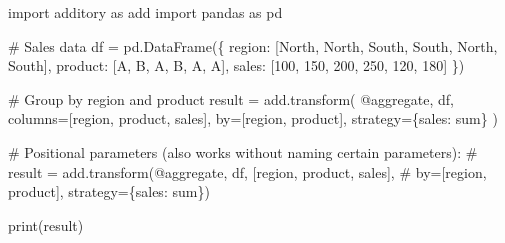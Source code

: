 \documentclass[
  letterpaper,
]{scrbook}
\newenvironment{Shaded}{\begin{snugshade}}{\end{snugshade}}
\newcommand{\BuiltInTok}[1]{\textcolor[rgb]{0.00,0.23,0.31}{#1}}
\newcommand{\CommentTok}[1]{\textcolor[rgb]{0.37,0.37,0.37}{#1}}
\newcommand{\DecValTok}[1]{\textcolor[rgb]{0.68,0.00,0.00}{#1}}
\newcommand{\ImportTok}[1]{\textcolor[rgb]{0.00,0.46,0.62}{#1}}
\newcommand{\NormalTok}[1]{\textcolor[rgb]{0.00,0.23,0.31}{#1}}
\newcommand{\OperatorTok}[1]{\textcolor[rgb]{0.37,0.37,0.37}{#1}}
\newcommand{\StringTok}[1]{\textcolor[rgb]{0.13,0.47,0.30}{#1}}
\begin{document}
\begin{Shaded}
\begin{Highlighting}[]
\ImportTok{import}\NormalTok{ additory }\ImportTok{as}\NormalTok{ add}
\ImportTok{import}\NormalTok{ pandas }\ImportTok{as}\NormalTok{ pd}

\CommentTok{\# Sales data}
\NormalTok{df }\OperatorTok{=}\NormalTok{ pd.DataFrame(\{}
    \StringTok{\textquotesingle{}region\textquotesingle{}}\NormalTok{: [}\StringTok{\textquotesingle{}North\textquotesingle{}}\NormalTok{, }\StringTok{\textquotesingle{}North\textquotesingle{}}\NormalTok{, }\StringTok{\textquotesingle{}South\textquotesingle{}}\NormalTok{, }\StringTok{\textquotesingle{}South\textquotesingle{}}\NormalTok{, }\StringTok{\textquotesingle{}North\textquotesingle{}}\NormalTok{, }\StringTok{\textquotesingle{}South\textquotesingle{}}\NormalTok{],}
    \StringTok{\textquotesingle{}product\textquotesingle{}}\NormalTok{: [}\StringTok{\textquotesingle{}A\textquotesingle{}}\NormalTok{, }\StringTok{\textquotesingle{}B\textquotesingle{}}\NormalTok{, }\StringTok{\textquotesingle{}A\textquotesingle{}}\NormalTok{, }\StringTok{\textquotesingle{}B\textquotesingle{}}\NormalTok{, }\StringTok{\textquotesingle{}A\textquotesingle{}}\NormalTok{, }\StringTok{\textquotesingle{}A\textquotesingle{}}\NormalTok{],}
    \StringTok{\textquotesingle{}sales\textquotesingle{}}\NormalTok{: [}\DecValTok{100}\NormalTok{, }\DecValTok{150}\NormalTok{, }\DecValTok{200}\NormalTok{, }\DecValTok{250}\NormalTok{, }\DecValTok{120}\NormalTok{, }\DecValTok{180}\NormalTok{]}
\NormalTok{\})}

\CommentTok{\# Group by region and product}
\NormalTok{result }\OperatorTok{=}\NormalTok{ add.transform(}
    \StringTok{\textquotesingle{}@aggregate\textquotesingle{}}\NormalTok{,}
\NormalTok{    df,}
\NormalTok{    columns}\OperatorTok{=}\NormalTok{[}\StringTok{\textquotesingle{}region\textquotesingle{}}\NormalTok{, }\StringTok{\textquotesingle{}product\textquotesingle{}}\NormalTok{, }\StringTok{\textquotesingle{}sales\textquotesingle{}}\NormalTok{],}
\NormalTok{    by}\OperatorTok{=}\NormalTok{[}\StringTok{\textquotesingle{}region\textquotesingle{}}\NormalTok{, }\StringTok{\textquotesingle{}product\textquotesingle{}}\NormalTok{],}
\NormalTok{    strategy}\OperatorTok{=}\NormalTok{\{}\StringTok{\textquotesingle{}sales\textquotesingle{}}\NormalTok{: }\StringTok{\textquotesingle{}sum\textquotesingle{}}\NormalTok{\}}
\NormalTok{)}

\CommentTok{\# Positional parameters (also works without naming certain parameters):}
\CommentTok{\# result = add.transform(\textquotesingle{}@aggregate\textquotesingle{}, df, [\textquotesingle{}region\textquotesingle{}, \textquotesingle{}product\textquotesingle{}, \textquotesingle{}sales\textquotesingle{}], }
\CommentTok{\#                        by=[\textquotesingle{}region\textquotesingle{}, \textquotesingle{}product\textquotesingle{}], strategy=\{\textquotesingle{}sales\textquotesingle{}: \textquotesingle{}sum\textquotesingle{}\})}

\BuiltInTok{print}\NormalTok{(result)}
\end{Highlighting}
\end{Shaded}
\end{document}
